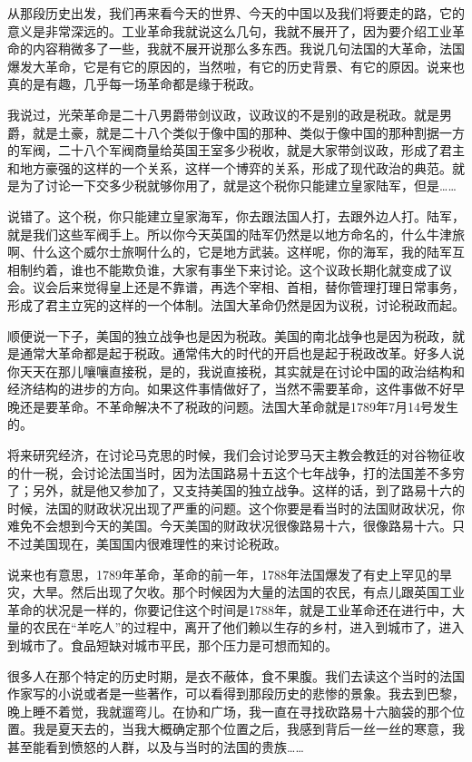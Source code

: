 \documentclass[UTF8, 12pt, a4paper]{ctexrep}
\begin{document}
从那段历史出发，我们再来看今天的世界、今天的中国以及我们将要走的路，它的意义是非常深远的。工业革命我就说这么几句，我就不展开了，因为要介绍工业革命的内容稍微多了一些，我就不展开说那么多东西。我说几句法国的大革命，法国爆发大革命，它是有它的原因的，当然啦，有它的历史背景、有它的原因。说来也真的是有趣，几乎每一场革命都是缘于税政。

我说过，光荣革命是二十八男爵带剑议政，议政议的不是别的政是税政。就是男爵，就是土豪，就是二十八个类似于像中国的那种、类似于像中国的那种割据一方的军阀，二十八个军阀商量给英国王室多少税收，就是大家带剑议政，形成了君主和地方豪强的这样的一个关系，这样一个博弈的关系，形成了现代政治的典范。就是为了讨论一下交多少税就够你用了，就是这个税你只能建立皇家陆军，但是……

说错了。这个税，你只能建立皇家海军，你去跟法国人打，去跟外边人打。陆军，就是我们这些军阀手上。所以你今天英国的陆军仍然是以地方命名的，什么牛津旅啊、什么这个威尔士旅啊什么的，它是地方武装。这样呢，你的海军，我的陆军互相制约着，谁也不能欺负谁，大家有事坐下来讨论。这个议政长期化就变成了议会。议会后来觉得皇上还是不靠谱，再选个宰相、首相，替你管理打理日常事务，形成了君主立宪的这样的一个体制。法国大革命仍然是因为议税，讨论税政而起。

顺便说一下子，美国的独立战争也是因为税政。美国的南北战争也是因为税政，就是通常大革命都是起于税政。通常伟大的时代的开启也是起于税政改革。好多人说你天天在那儿嚷嚷直接税，是的，我说直接税，其实就是在讨论中国的政治结构和经济结构的进步的方向。如果这件事情做好了，当然不需要革命，这件事做不好早晚还是要革命。不革命解决不了税政的问题。法国大革命就是1789年7月14号发生的。

将来研究经济，在讨论马克思的时候，我们会讨论罗马天主教会教廷的对谷物征收的什一税，会讨论法国当时，因为法国路易十五这个七年战争，打的法国差不多穷了；另外，就是他又参加了，又支持美国的独立战争。这样的话，到了路易十六的时候，法国的财政状况出现了严重的问题。这个你要是看当时的法国财政状况，你难免不会想到今天的美国。今天美国的财政状况很像路易十六，很像路易十六。只不过美国现在，美国国内很难理性的来讨论税政。

说来也有意思，1789年革命，革命的前一年，1788年法国爆发了有史上罕见的旱灾，大旱。然后出现了欠收。那个时候因为大量的法国的农民，有点儿跟英国工业革命的状况是一样的，你要记住这个时间是1788年，就是工业革命还在进行中，大量的农民在“羊吃人”的过程中，离开了他们赖以生存的乡村，进入到城市了，进入到城市了。食品短缺对城市平民，那个压力是可想而知的。

很多人在那个特定的历史时期，是衣不蔽体，食不果腹。我们去读这个当时的法国作家写的小说或者是一些著作，可以看得到那段历史的悲惨的景象。我去到巴黎，晚上睡不着觉，我就遛弯儿。在协和广场，我一直在寻找砍路易十六脑袋的那个位置。我是夏天去的，当我大概确定那个位置之后，我感到背后一丝一丝的寒意，我甚至能看到愤怒的人群，以及与当时的法国的贵族……
\end{document}
